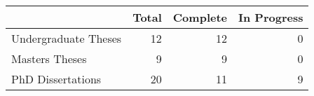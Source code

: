 \begin{tabular}{lrrr}
\toprule
 & Total & Complete & In Progress \\
\midrule
Undergraduate Theses & 12 & 12 & 0 \\
Masters Theses & 9 & 9 & 0 \\
PhD Dissertations & 20 & 11 & 9 \\
\bottomrule
\end{tabular}
